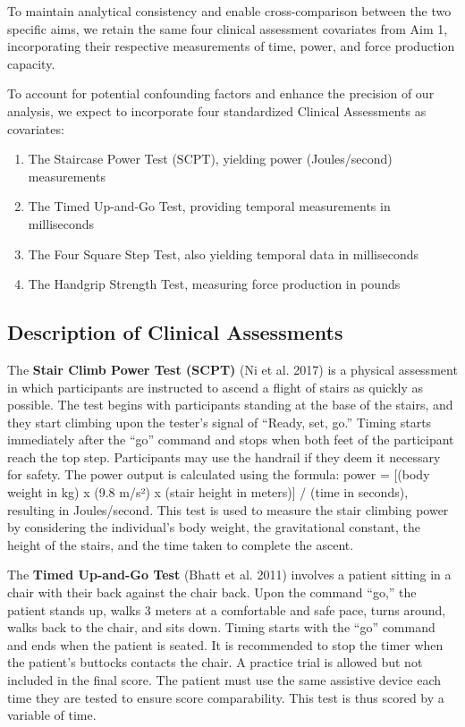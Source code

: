\documentclass[
  letterpaper,
  DIV=11,
  numbers=noendperiod]{scrartcl}
\providecommand{\tightlist}{%
  \setlength{\itemsep}{0pt}\setlength{\parskip}{0pt}}\usepackage{longtable,booktabs,array}
\begin{document}
To maintain analytical consistency and enable cross-comparison between
the two specific aims, we retain the same four clinical assessment
covariates from Aim 1, incorporating their respective measurements of
time, power, and force production capacity.

To account for potential confounding factors and enhance the precision
of our analysis, we expect to incorporate four standardized Clinical
Assessments as covariates:

\begin{enumerate}
\def\labelenumi{\arabic{enumi}.}
\tightlist
\item
  The Staircase Power Test (SCPT), yielding power (Joules/second)
  measurements
\item
  The Timed Up-and-Go Test, providing temporal measurements in
  milliseconds
\item
  The Four Square Step Test, also yielding temporal data in milliseconds
\item
  The Handgrip Strength Test, measuring force production in pounds
\end{enumerate}

\subsection{Description of Clinical
Assessments}\label{description-of-clinical-assessments}

The \textbf{Stair Climb Power Test (SCPT)} (Ni et al. 2017) is a
physical assessment in which participants are instructed to ascend a
flight of stairs as quickly as possible. The test begins with
participants standing at the base of the stairs, and they start climbing
upon the tester's signal of ``Ready, set, go.'' Timing starts
immediately after the ``go'' command and stops when both feet of the
participant reach the top step. Participants may use the handrail if
they deem it necessary for safety. The power output is calculated using
the formula: power = {[}(body weight in kg) x (9.8 m/s²) x (stair height
in meters){]} / (time in seconds), resulting in Joules/second. This test
is used to measure the stair climbing power by considering the
individual's body weight, the gravitational constant, the height of the
stairs, and the time taken to complete the ascent.

The \textbf{Timed Up-and-Go Test} (Bhatt et al. 2011) involves a patient
sitting in a chair with their back against the chair back. Upon the
command ``go,'' the patient stands up, walks 3 meters at a comfortable
and safe pace, turns around, walks back to the chair, and sits down.
Timing starts with the ``go'' command and ends when the patient is
seated. It is recommended to stop the timer when the patient's buttocks
contacts the chair. A practice trial is allowed but not included in the
final score. The patient must use the same assistive device each time
they are tested to ensure score comparability. This test is thus scored
by a variable of time.
\end{document}
